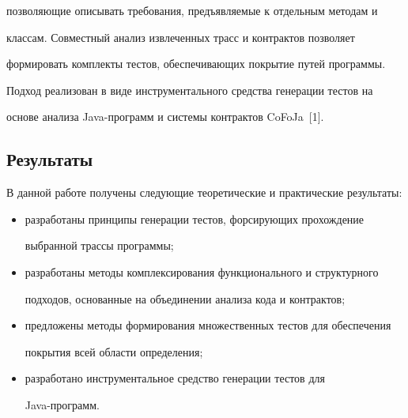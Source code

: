 позволяющие описывать требования, предъявляемые к отдельным методам и


классам. Совместный анализ извлеченных трасс и контрактов позволяет


формировать комплекты тестов, обеспечивающих покрытие путей программы.


Подход реализован в виде инструментального средства генерации тестов на


основе анализа Java-про\-грамм и системы контрактов CoFoJa~[1].





      \vspace*{-6pt}





\subsection{Результаты}





В данной работе получены следующие теоретические и практические результаты:


\begin{itemize}


\item разработаны принципы генерации тестов, форсирующих прохождение


выбранной трассы программы;


\item разработаны методы комплексирования функционального и структурного


подходов, основанные на объединении анализа кода и контрактов;


\item предложены методы формирования множественных тестов для обеспечения


покрытия всей области определения;


\item разработано инструментальное средство генерации тестов для


Java-про\-грамм.


\end{itemize}





      \vspace*{-6pt}





